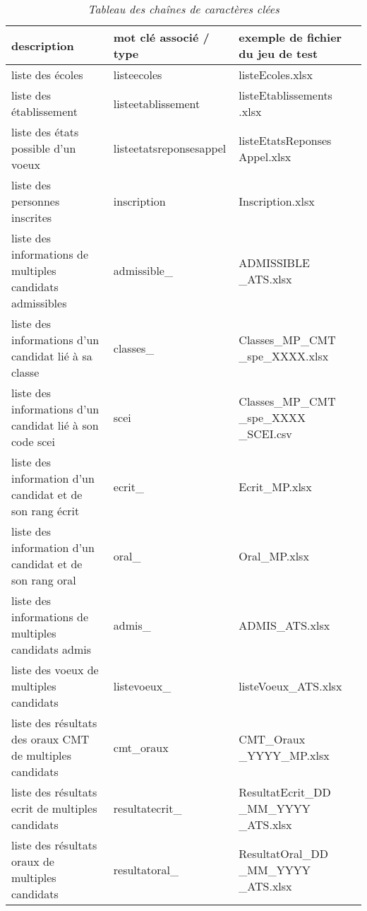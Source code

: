 \begin{table}[]
    \centering
    \begin{tabularx}{\linewidth}{ | X | X | X | }
      \hline
            description  &  mot clé associé / type & exemple de fichier du jeu de test\\
      \hline
            liste des écoles & listeecoles & listeEcoles.xlsx\\
      \hline
            liste des établissement & listeetablissement & listeEtablissements .xlsx\\
      \hline
            liste des états possible d'un voeux & listeetatsreponsesappel & listeEtatsReponses Appel.xlsx\\
      \hline
            liste des personnes inscrites & inscription & Inscription.xlsx\\
      \hline
            liste des informations de multiples candidats admissibles & admissible\_ & ADMISSIBLE \_ATS.xlsx\\
      \hline
          liste des informations d'un candidat lié à sa classe  & classes\_ & Classes\_MP\_CMT \_spe\_XXXX.xlsx \\
      \hline
          liste des informations d'un candidat lié à son code scei & scei & Classes\_MP\_CMT \_spe\_XXXX \_SCEI.csv\\
      \hline
          liste des information d'un candidat et de son rang écrit  & ecrit\_ & Ecrit\_MP.xlsx\\
      \hline
          liste des information d'un candidat et de son rang oral & oral\_ & Oral\_MP.xlsx\\
      \hline
          liste des informations de multiples candidats admis & admis\_ & ADMIS\_ATS.xlsx\\
      \hline
          liste des voeux de multiples candidats & listevoeux\_ & listeVoeux\_ATS.xlsx\\
      \hline
          liste des résultats des oraux CMT de multiples candidats & cmt\_oraux & CMT\_Oraux \_YYYY\_MP.xlsx\\
      \hline
          liste des résultats ecrit de multiples candidats & resultatecrit\_ & ResultatEcrit\_DD \_MM\_YYYY \_ATS.xlsx\\
      \hline
          liste des résultats oraux de multiples candidats & resultatoral\_ & ResultatOral\_DD \_MM\_YYYY \_ATS.xlsx\\
      \hline
    \end{tabularx}
    \caption{\textit{Tableau des chaînes de caractères clées}} 
    \label{tab:TableKeyChar}
\end{table}

